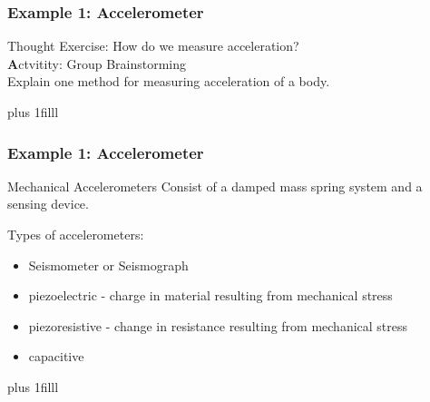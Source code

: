 \documentclass[fleqn]{beamer} %
\newcommand{\sectionIIsubsectionIIItitle}{Example 1: Accelerometer}
\newcommand{\btVFill}{\vskip0pt plus 1filll}
\begin{document}
			\begin{frame}
				\frametitle{\sectionIIsubsectionIIItitle}

			 	Thought Exercise: How do we measure acceleration? \vspace{10mm}\\                      
	
			 	{\textbf Actvitity:} Group Brainstorming \\
				Explain one method for measuring acceleration of a body.

			    \btVFill

			\end{frame}

			\begin{frame}
			\frametitle{\sectionIIsubsectionIIItitle}

				Mechanical Accelerometers Consist of a damped mass spring system and a sensing device.
	
			 	Types of accelerometers:

			 	\begin{itemize}
			 		
			 		\item Seismometer or Seismograph

			 		\item piezoelectric - charge in material resulting from mechanical stress

			 		\item piezoresistive - change in resistance resulting from mechanical stress

			 		\item capacitive 

			 	\end{itemize}

			 
			    \btVFill

			\end{frame}
\end{document}
